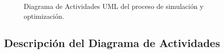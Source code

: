\begin{figure}[H] %
    \centering
    \caption{Diagrama de Actividades UML del proceso de simulación y optimización.}%
    \label{fig:activity_diagram} %
\end{figure}
\newpage
\subsection{Descripción del Diagrama de Actividades}

